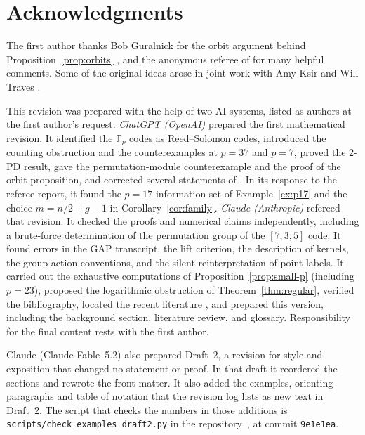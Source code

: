\documentclass[12pt,letterpaper]{article}
\theoremstyle{definition}
\theoremstyle{remark}
\numberwithin{equation}{section}
\newcommand{\F}{\mathbb{F}}
\begin{document}
\section*{Acknowledgments}

The first author thanks Bob Guralnick for the orbit argument behind
Proposition~\ref{prop:orbits} \cite{Gu04}, and the anonymous referee of
\cite{Jo05} for many helpful comments.  Some of the original ideas arose
in joint work with Amy Ksir and Will Traves \cite{JK06,JK03,JT02}.

This revision was prepared with the help of two AI systems, listed as
authors at the first author's request.
\emph{ChatGPT (OpenAI)} prepared the first mathematical revision.  It
identified the $\F_p$ codes as Reed--Solomon codes, introduced the
counting obstruction and the counterexamples at $p=37$ and $p=7$, proved
the $2$-PD result, gave the permutation-module counterexample and the
proof of the orbit proposition, and corrected several statements of
\cite{Jo05}.  In its response to the referee report, it found the $p=17$
information set of Example~\ref{ex:p17} and the choice
$m=n/2+g-1$ in Corollary~\ref{cor:family}.
\emph{Claude (Anthropic)} refereed that revision.  It checked the
proofs and numerical claims independently, including a brute-force
determination of the permutation group of the $[7,3,5]$ code.  It found
errors in the GAP transcript, the lift criterion, the description of
kernels, the group-action conventions, and the silent reinterpretation of
point labels.  It carried out the exhaustive computations of
Proposition~\ref{prop:small-p} (including $p=23$), proposed the
logarithmic obstruction of
Theorem~\ref{thm:regular}, verified the bibliography, located the recent
literature \cite{CTO26,LLMS26,CLLS25}, and prepared this version, including
the background section, literature review, and glossary.
Responsibility for the final content rests with the first author.

Claude (Claude Fable~5.2) also prepared Draft~2, a revision for style and
exposition that changed no statement or proof. In that draft it reordered
the sections and rewrote the front matter. It also added the examples,
orienting paragraphs and table of notation that the revision log lists as
new text in Draft~2. The script that checks the numbers in those
additions is \texttt{scripts/check\_examples\_draft2.py} in the
repository~\cite{Jo26}, at commit \texttt{9e1e1ea}.
\end{document}
